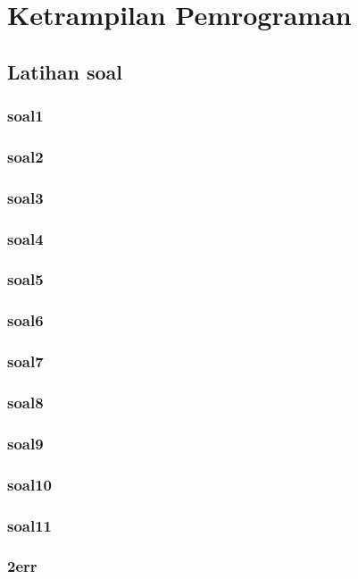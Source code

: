 \chapter*{Ketrampilan Pemrograman}
\section*{Latihan soal}
\subsection*{soal1}

\subsection*{soal2}

\subsection*{soal3}

\subsection*{soal4}

\subsection*{soal5}

\subsection*{soal6}

\subsection*{soal7}

\subsection*{soal8}

\subsection*{soal9}

\subsection*{soal10}

\subsection*{soal11}

\subsection*{2err}



